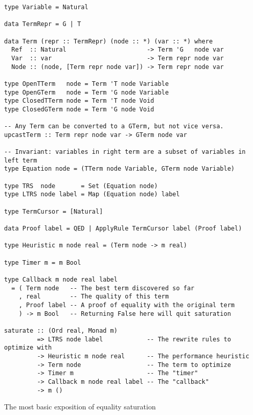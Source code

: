 \documentclass[11pt]{report}
\newcommand{\haskell}[1]{\texttt{#1}}
\newlength{\fixmewidth}
\newcommand{\fixme}[1]{%
  \begin{minipage}[c]{\fixmewidth}%
  \todo[color=green!40,inline]{\textsc{fixme:} #1}%
  \end{minipage}}
\begin{document}
\begin{listing}[ht]
\begin{verbatim}
type Variable = Natural

data TermRepr = G | T

data Term (repr :: TermRepr) (node :: *) (var :: *) where
  Ref  :: Natural                      -> Term 'G   node var
  Var  :: var                          -> Term repr node var
  Node :: (node, [Term repr node var]) -> Term repr node var

type OpenTTerm   node = Term 'T node Variable
type OpenGTerm   node = Term 'G node Variable
type ClosedTTerm node = Term 'T node Void
type ClosedGTerm node = Term 'G node Void

-- Any Term can be converted to a GTerm, but not vice versa.
upcastTerm :: Term repr node var -> GTerm node var

-- Invariant: variables in right term are a subset of variables in left term
type Equation node = (TTerm node Variable, GTerm node Variable)

type TRS  node       = Set (Equation node)
type LTRS node label = Map (Equation node) label

type TermCursor = [Natural]

data Proof label = QED | ApplyRule TermCursor label (Proof label)

type Heuristic m node real = (Term node -> m real)

type Timer m = m Bool

type Callback m node real label
  = ( Term node   -- The best term discovered so far
    , real        -- The quality of this term
    , Proof label -- A proof of equality with the original term
    ) -> m Bool   -- Returning False here will quit saturation

saturate :: (Ord real, Monad m)
         => LTRS node label            -- The rewrite rules to optimize with
         -> Heuristic m node real      -- The performance heuristic
         -> Term node                  -- The term to optimize
         -> Timer m                    -- The "timer"
         -> Callback m node real label -- The "callback"
         -> m ()
\end{verbatim}
\caption{The most basic exposition of equality saturation}
\label{lst:basic-eqsat}
\end{listing}


\fixme{explain more about eqsat}
\end{document}
